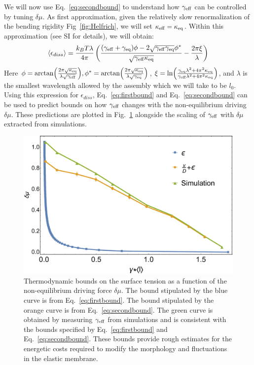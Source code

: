 \documentclass[amsmath,preprintnumbers,10pt,nofootinbib,prl,twocolumn]{revtex4-1}
\begin{document}
We will now use Eq.~\ref{eq:secondbound} to understand how $\gamma_{\rm eff}$ can be controlled by tuning $\delta \mu$. As first approximation, given the relatively slow renormalization of the bending rigidity Fig~\ref{fig:Helfrich}, we will set $\kappa_{\rm eff}=\kappa_{\rm eq}$. Within this approximation (see SI for details), we will obtain: 
\begin{equation}
\label{eq:epsilonexpress}
 \langle\epsilon_{diss}\rangle =\frac{k_{B}T\lambda}{4\pi}\left ( \frac{(\gamma_{\rm eff} + \gamma_{\rm eq})\phi-2\sqrt{\gamma_{\rm eff}\gamma_{\rm eq}}\phi^*}{\sqrt{\gamma_{\rm eff} \kappa_{\rm eq}}}-\frac{2\pi \xi}{\lambda} \right)
\end{equation}
Here $\phi=\arctan(\frac{2\pi\sqrt{\kappa_{\rm eq}}}{\lambda\sqrt{\gamma_{\rm eff}}}), \phi^*=\arctan(\frac{2\pi\sqrt{\kappa_{\rm eq}}}{\lambda\sqrt{\gamma_{\rm{eq}}}})$, $\xi=\ln(\frac{\gamma_{\rm{eq}}\lambda^2+4\pi^2\kappa_{\rm eq}}{\gamma_{\rm eff}\lambda^2+4\pi^2\kappa_{\rm eq}})$, and $\lambda$ is the smallest wavelength allowed by the assembly which we will take to be $l_0$. Using this expression for $\epsilon_{diss}$, Eq.~\ref{eq:firstbound} and Eq.~\ref{eq:secondbound} can be used to predict bounds on how $\gamma_{\rm eff}$ changes with the non-equilibrium driving $\delta \mu$. These predictions are plotted in Fig.~\ref{fig:PhaseDiagram} alongside the scaling of $\gamma_{\rm eff}$ with $\delta \mu$ extracted from simulations. 

\begin{figure}[tbb]
\centering
\includegraphics[scale=0.28]{boundscheckFig6.pdf}
\caption{Thermodynamic bounds on the surface tension as a function of the non-equilibrium driving force $\delta\mu$. The bound stipulated by the blue curve is from Eq.~\ref{eq:firstbound}. The bound stipulated by the orange curve is from Eq.~\ref{eq:secondbound}. The green curve is obtained by measuring $\gamma_{\rm{eff}}$ from simulations and is consistent with the bounds specified by Eq.~\ref{eq:firstbound} and Eq.~\ref{eq:secondbound}. These bounds provide rough estimates for the energetic costs required to modify the morphology and fluctuations in the elastic membrane. }\label{fig:PhaseDiagram}
\end{figure}
\end{document}
